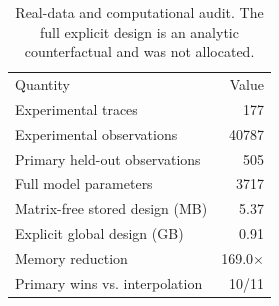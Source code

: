 \begin{table}[t]
\centering
\caption{Real-data and computational audit. The full explicit design is an analytic counterfactual and was not allocated.}\label{tab:real_audit}
\begin{ruledtabular}\begin{tabular}{lr}
Quantity & Value \\
\colrule
Experimental traces & 177 \\
Experimental observations & 40787 \\
Primary held-out observations & 505 \\
Full model parameters & 3717 \\
Matrix-free stored design (MB) & 5.37 \\
Explicit global design (GB) & 0.91 \\
Memory reduction & 169.0$\times$ \\
Primary wins vs. interpolation & 10/11 \\
\end{tabular}\end{ruledtabular}
\end{table}
